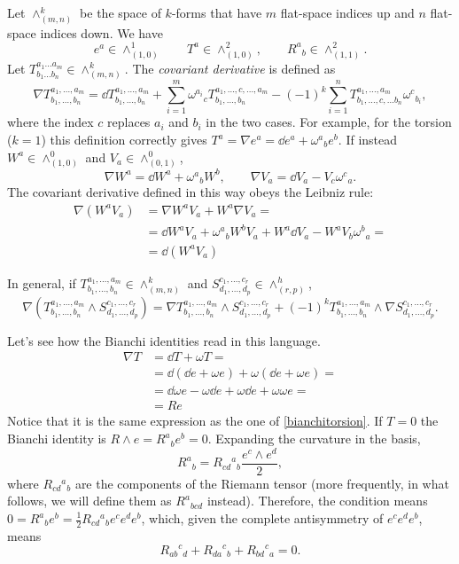 \documentclass[a4paper,12pt]{book}
\begin{document}
Let $\wedge^k_{(m,n)}$ be the space of $k$-forms that have $m$ flat-space indices up and $n$ flat-space indices down. We have
\[e^a\in\wedge^1_{(1,0)}\qquad T^a\in\wedge^2_{(1,0)},\qquad R^a{}_b\in\wedge^2_{(1,1)}.\]
Let $T^{a_1\ldots a_m}_{b_1\ldots b_n}\in\wedge^k_{(m,n)}$. The \emph{covariant derivative} is defined as
\begin{equation}
\nabla T^{a_1,\ldots, a_m}_{b_1,\ldots, b_n}=\dd T^{a_1,\ldots, a_m}_{b_1,\ldots, b_n}+\sum_{i=1}^m\omega^{a_i}{}_cT^{a_1,\ldots ,c,\ldots, a_m}_{b_1,\ldots, b_n}-(-1)^k\sum_{i=1}^nT^{a_1,\ldots, a_m}_{b_1,\ldots, c,\ldots b_n}\omega^c{}_{b_i},
\label{eqn:covariantderivative}
\end{equation}
where the index $c$ replaces $a_i$ and $b_i$ in the two cases.
For example, for the torsion ($k=1$) this definition correctly gives $T^a=\nabla e^a=\dd e^a+\omega^a{}_be^b$. If instead $W^a\in\wedge^0_{(1,0)}$ and $V_a\in\wedge^0_{(0,1)}$,
\[\nabla W^a=\dd W^a+\omega^a{}_bW^b,\qquad \nabla V_a=\dd V_a-V_c\omega^c{}_a.\]
The covariant derivative defined in this way obeys the Leibniz rule:
\begin{align*}
\nabla(W^aV_a)&=\nabla W^aV_a+W^a\nabla V_a=\\
&=\dd W^aV_a+\omega^a{}_bW^bV_a+W^a\dd V_a-W^aV_b\omega^b{}_a=\\
&=\dd(W^aV_a)\end{align*}

\begin{exercise}
In general, if $T^{a_1,\ldots,a_m}_{b_1,\ldots,b_n}\in\wedge^k_{(m,n)}$ and $S^{c_1,\ldots,c_r}_{d_1,\ldots,d_p}\in\wedge^h_{(r,p)}$,
\[\nabla(T^{a_1,\ldots,a_m}_{b_1,\ldots,b_n}\wedge S^{c_1,\ldots,c_r}_{d_1,\ldots,d_p})=\nabla T^{a_1,\ldots,a_m}_{b_1,\ldots,b_n}\wedge S^{c_1,\ldots,c_r}_{d_1,\ldots,d_p} +(-1)^kT^{a_1,\ldots,a_m}_{b_1,\ldots,b_n}\wedge\nabla S^{c_1,\ldots,c_r}_{d_1,\ldots,d_p}.\]
\end{exercise}

Let's see how the Bianchi identities read in this language.
\begin{align*}
\nabla T&=\dd T+\omega T=\\
&=\dd(\dd e+\omega e)+\omega(\dd e+\omega e)=\\
&=\dd\omega e-\omega\dd e+\omega\dd e+\omega\omega e=\\
&=Re
\end{align*}
Notice that it is the same expression as the one of \cref{bianchitorsion}. If $T=0$ the Bianchi identity is $R\wedge e=R^a{}_be^b=0$. Expanding the curvature in the basis,
\[R^a{}_b=R_{cd}{}^a{}_b\frac{e^c\wedge e^d}{2},\]
where $R_{cd}{}^a{}_b$ are the components of the Riemann tensor (more frequently, in what follows, we will define them as $R^a{}_{bcd}$ instead). Therefore, the condition means $0=R^a{}_be^b=\frac{1}{2}R_{cd}{}^a{}_be^ce^de^b$, which, given the complete antisymmetry of $e^ce^de^b$, means
\[R_{ab}{}^c{}_d+R_{da}{}^c{}_b+R_{bd}{}^c{}_a=0.\]
\end{document}
